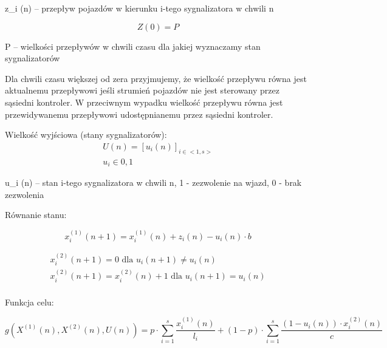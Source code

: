 z_{i} (n) \textrm{ -- przepływ pojazdów w kierunku i-tego sygnalizatora w chwili n}

\begin{equation}
	Z (0) = P
\end{equation}

P -- wielkości przepływów w chwili czasu dla jakiej wyznaczamy stan sygnalizatorów

\vspace{1.5cm}
Dla chwili czasu większej od zera przyjmujemy, że wielkość przepływu równa jest aktualnemu przepływowi jeśli strumień pojazdów nie jest sterowany przez sąsiedni kontroler. W przeciwnym wypadku wielkość przepływu równa jest przewidywanemu przepływowi udostępnianemu przez sąsiedni kontroler.

\vspace{1.5cm}
Wielkość wyjściowa (stany sygnalizatorów):
\begin{equation}
	\begin{array}{c}
		U (n) = [u_{i} (n)]_{i \in <1,s>}\\
		u_{i} \in {0, 1}
	\end{array}
\end{equation}

u_{i} (n) \textrm{ -- stan i-tego sygnalizatora w chwili n, 1 - zezwolenie na wjazd, 0 - brak zezwolenia}

\vspace{1.5cm}
Równanie stanu:

\begin{equation}
	x^{(1)}_{i} (n+1) = x^{(1)}_{i} (n) + z_{i} (n) - u_{i} (n) \cdot b
\end{equation}

\begin{equation}
	\begin{array}{c}
		x^{(2)}_{i} (n+1) = 0 \textrm{ dla } u_{i} (n+1) \neq u_{i} (n)\\
		x^{(2)}_{i} (n+1) = x^{(2)}_{i} (n) + 1 \textrm{ dla } u_{i} (n+1) = u_{i} (n)\\
	\end{array}
\end{equation}

\vspace{1.5cm}
Funkcja celu:

\begin{equation}
	\label{eq:f_celu}
	g(X^{(1)} (n), X^{(2)} (n), U (n)) =
		p \cdot \sum\limits_{i=1}^{s} \frac{x^{(1)}_{i} (n)}{l_{i}}
		+ (1-p) \cdot \sum\limits_{i=1}^{s} \frac{(1-u_{i} (n)) \cdot x^{(2)}_{i} (n)}{c}
\end{equation}

